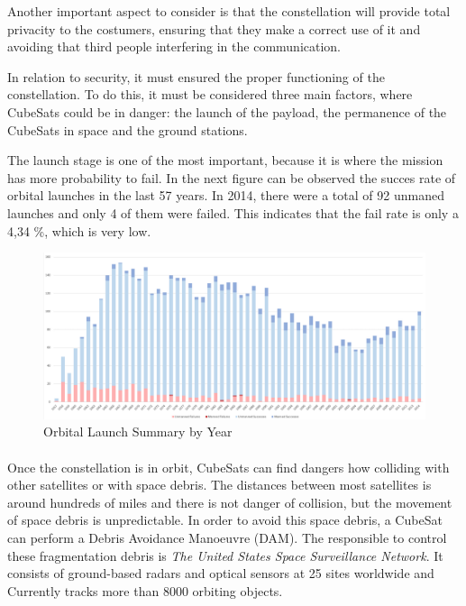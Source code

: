 Another important aspect to consider is that the constellation will provide total privacity  to the costumers, ensuring that they make a correct use of it and avoiding that third people interfering in the communication.

In relation to security, it must ensured the proper functioning of the constellation. To do this, it must be considered three main factors, where CubeSats could be in danger: the launch of the payload, the permanence of the CubeSats in space and the ground stations.

The launch stage is one of the most important, because it is where the mission has more probability to fail. In the next figure can be observed the succes rate of orbital launches in the last 57 years. In 2014, there were a total of 92 unmaned launches and only 4 of them were failed. This indicates that the fail rate is only a 4,34 \%, which is very low. 

\pagebreak

\begin{figure}[h!]
\includegraphics[scale=0.3]{./OrbitalSummary}
\centering
\caption{Orbital Launch Summary by Year}
\end{figure}

\paragraph{}Once the constellation is in orbit, CubeSats can find dangers how colliding with other satellites or with space debris. The distances between most satellites is around hundreds of miles and there is not danger of collision, but the movement of space debris is unpredictable. In order to avoid this space debris, a CubeSat can perform a Debris Avoidance Manoeuvre (DAM). The responsible to control these fragmentation debris is \textit{The United States Space Surveillance Network}. It consists of ground-based radars and optical sensors at 25 sites worldwide and Currently tracks more than 8000 orbiting objects.

